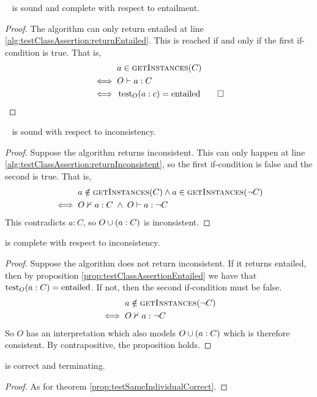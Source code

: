 \documentclass[paper.tex]{subfiles}
\begin{document}
\begin{proposition}
  \label{prop:testClassAssertionEntailed}
  \sloppy~
   is sound and complete with respect to entailment.
\end{proposition}
\begin{proof}
  The algorithm can only return entailed at line \ref{alg:testClassAssertion:returnEntailed}.  This is reached if and only if the first if-condition is true.  That is,
  \begin{align*}
    & a \in \Call{getInstances}{C} \\
    \iff{}& O \sementails a : C \\
    \iff{}& \test_O(a : c) = \entailed \qed
  \end{align*}
\end{proof}

\begin{proposition}
  \sloppy~
   is sound with respect to inconsistency.
\end{proposition}
\begin{proof}
  Suppose the algorithm returns inconsistent.  This can only happen at line \ref{alg:testClassAssertion:returnInconsistent}, so the first if-condition is false and the second is true.  That is,
  \begin{align*}
    & a \notin \Call{getInstances}{C} \land a \in \Call{getInstances}{\neg C} \\
    \iff{}& O \nsementails a : C \;\land\; O \sementails a : \neg C
  \end{align*}
  This contradicts $a : C$, so $O \cup (a : C)$ is inconsistent.
\end{proof}

\begin{proposition}
   is complete with respect to inconsistency.
\end{proposition}
\begin{proof}
  Suppose the algorithm does not return inconsistent.  If it returns entailed, then by proposition \ref{prop:testClassAssertionEntailed} we have that $\operatorname{test}_O(a : C) = \mathrm{entailed}$.  If not, then the second if-condition must be false.
  \begin{align*}
    & a \notin \Call{getInstances}{\neg C} \\
    \iff{}& O \nsementails a : \neg C
  \end{align*}
  So $O$ has an interpretation which also models $O \cup (a : C)$ which is therefore consistent.  By contrapositive, the proposition holds.
\end{proof}

\begin{theorem}
   is correct and terminating.
\end{theorem}
\begin{proof}
  As for theorem \ref{prop:testSameIndividualCorrect}.
\end{proof}
\end{document}
